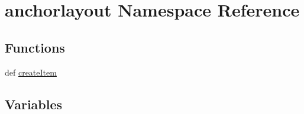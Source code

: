 \hypertarget{namespaceanchorlayout}{}\section{anchorlayout Namespace Reference}
\label{namespaceanchorlayout}
\subsection*{Functions}
\begin{DoxyCompactItemize}
\item 
def \hyperlink{namespaceanchorlayout_a11ae2d85a1b885805f98886a40e6bd0d}{create\+Item}
\end{DoxyCompactItemize}
\subsection*{Variables}
